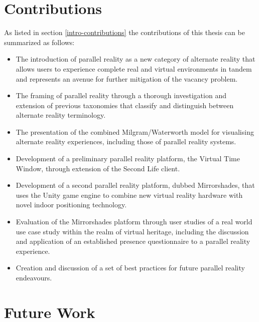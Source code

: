 
\section{Contributions}

As listed in section \ref{intro-contributions} the contributions of this thesis can be summarized as follows:

\begin{itemize}
	\item The introduction of parallel reality as a new category of alternate reality that allows users to experience complete real and virtual environments in tandem and represents an avenue for further mitigation of the vacancy problem.
	\item The framing of parallel reality through a thorough investigation and extension of previous taxonomies that classify and distinguish between alternate reality terminology.
	\item The presentation of the combined Milgram/Waterworth model for visualising alternate reality experiences, including those of parallel reality systems.
	\item Development of a preliminary parallel reality platform, the Virtual Time Window, through extension of the Second Life client.
	\item Development of a second parallel reality platform, dubbed Mirrorshades, that uses the Unity game engine to combine new virtual reality hardware with novel indoor positioning technology.
	\item Evaluation of the Mirrorshades platform through user studies of a real world use case study within the realm of virtual heritage, including the discussion and application of an established presence questionnaire to a parallel reality experience.
	\item Creation and discussion of a set of best practices for future parallel reality endeavours.
\end{itemize}


\section{Future Work}

